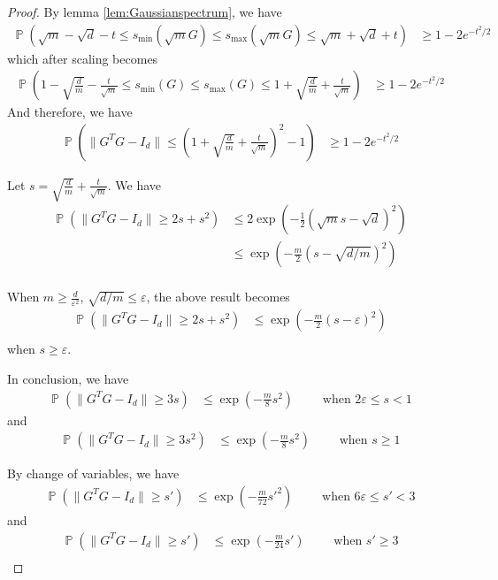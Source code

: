 \documentclass[11pt]{amsart}
\numberwithin{equation}{section}
\numberwithin{equation}{section}
\DeclareMathOperator{\Pb}{\mathbb{P}}
\theoremstyle{remark}
\theoremstyle{definition}
\begin{document}
\begin{proof}

    By lemma \ref{lem:Gaussianspectrum}, we have
\begin{align*}
    \Pb(\sqrt{m}-\sqrt{d}-t \leq s_{\min}(\sqrt{m}G) \leq s_{\max}(\sqrt{m}G) \leq \sqrt{m}+\sqrt{d}+t) &\geq 1 - 2e^{-t^2/2}
\end{align*}
which after scaling becomes
\begin{align*}
    \Pb(1-\sqrt{\frac{d}{m}}- \frac{t}{\sqrt{m}} \leq s_{\min}(G) \leq s_{\max}(G) \leq 1+\sqrt{\frac{d}{m}}+ \frac{t}{\sqrt{m}}) &\geq 1 - 2e^{-t^2/2}
\end{align*}
And therefore, we have
\begin{align*}
    \Pb ( \| G^TG - I_d \| \leq ( 1 + \sqrt{\frac{d}{m}}+ \frac{t}{\sqrt{m}})^2 - 1 ) &\geq 1 - 2e^{-t^2/2}
\end{align*}


    
Let $s = \sqrt{\frac{d}{m}}+ \frac{t}{\sqrt{m}}$. We have
\begin{align*}
    \Pb ( \| G^TG - I_d \| \ge 2s + s^2 )  &\le 2\exp(-\frac{1}{2}(\sqrt{m}s-\sqrt{d})^2) \\
    &\le \exp(-\frac{m}{2} (s-\sqrt{d/m})^2) \\
\end{align*}

When $m \ge \frac{d}{\varepsilon^2}$, $\sqrt{d/m} \le \varepsilon$, the above result becomes 
\begin{align*}
    \Pb ( \| G^TG - I_d \| \ge 2s + s^2 )  &\le \exp(-\frac{m}{2} (s-\varepsilon)^2) \\
\end{align*} 
when $s \ge \varepsilon$.

In conclusion, we have
\begin{align*}
    \Pb ( \| G^TG - I_d \| \ge 3s)  &\le \exp(-\frac{m}{8} s^2) \qquad \text{ when } 2\varepsilon \le s < 1 
\end{align*}
and
\begin{align*}
     \Pb ( \| G^TG - I_d \| \ge 3s^2)  &\le \exp(-\frac{m}{8} s^2) \qquad \text{ when }  s \ge  1 
\end{align*}

By change of variables, we have
\begin{align*}
    \Pb ( \| G^TG - I_d \| \ge s')  &\le \exp(-\frac{m}{72} s'^2) \qquad \text{ when } 6\varepsilon \le s' < 3 \end{align*} and \begin{align*}
    \Pb ( \| G^TG - I_d \| \ge s')  &\le \exp(-\frac{m}{24} s') \qquad \text{ when }  s' \ge  3 \\
\end{align*}


\end{proof}
\end{document}
